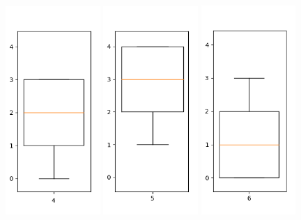 \begin{figure}[h]
\includegraphics[width=0.32\textwidth]{4.png}
\includegraphics[width=0.32\textwidth]{5.png}
\includegraphics[width=0.32\textwidth]{6.png}

\end{figure}
